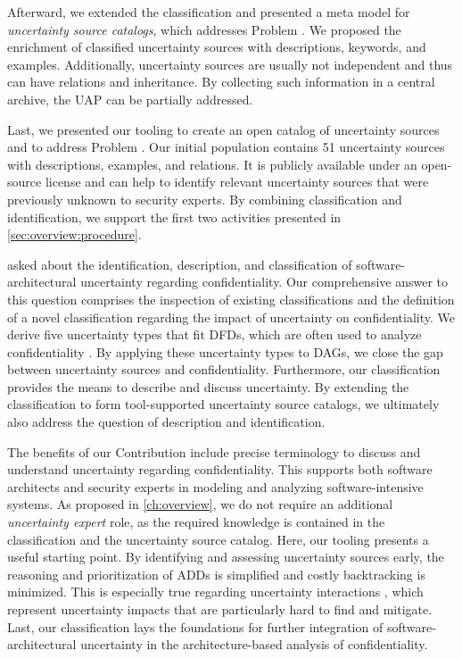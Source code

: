Afterward, we extended the classification and presented a meta model for \emph{uncertainty source catalogs}, which addresses Problem .
We proposed the enrichment of classified uncertainty sources with descriptions, keywords, and examples.
Additionally, uncertainty sources are usually not independent \cite{camara_addressing_2022} and thus can have relations and inheritance.
By collecting such information in a central archive, the \ac{UAP} can be partially addressed.

Last, we presented our tooling \arcen to create an open catalog of uncertainty sources and to address Problem .
Our initial population contains 51 uncertainty sources with descriptions, examples, and relations.
It is publicly available under an open-source license and can help to identify relevant uncertainty sources that were previously unknown to security experts.
By combining classification and identification, we support the first two activities presented in \autoref{sec:overview:procedure}.

 asked about the identification, description, and classification of software-architectural uncertainty regarding confidentiality.
Our comprehensive answer to this question comprises the inspection of existing classifications and the definition of a novel classification regarding the impact of uncertainty on confidentiality.
We derive five uncertainty types that fit \acp{DFD}, which are often used to analyze confidentiality \cite{seifermann_unified_2021}.
By applying these uncertainty types to \acp{DAG}, we close the gap between uncertainty sources and confidentiality.
Furthermore, our classification provides the means to describe and discuss uncertainty.
By extending the classification to form tool-supported uncertainty source catalogs, we ultimately also address the question of description and identification.

The benefits of our Contribution  include precise terminology to discuss and understand uncertainty regarding confidentiality.
This supports both software architects and security experts in modeling and analyzing software-intensive systems.
As proposed in \autoref{ch:overview}, we do not require an additional \emph{uncertainty expert} role, as the required knowledge is contained in the classification and the uncertainty source catalog.
Here, our tooling \arcen presents a useful starting point.
By identifying and assessing uncertainty sources early, the reasoning and prioritization of \acp{ADD} is simplified and costly backtracking is minimized.
This is especially true regarding uncertainty interactions \cite{camara_addressing_2022}, which represent uncertainty impacts that are particularly hard to find and mitigate.
Last, our classification lays the foundations for further integration of software-architectural uncertainty in the architecture-based analysis of confidentiality.

